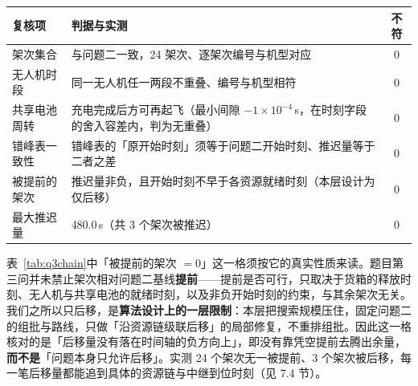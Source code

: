 \begin{center}
\begin{minipage}{\textwidth}
	\label{tab:q3chain}
	\centering
	\begin{tabularx}{0.98\textwidth}{lXc}
		\toprule
		复核项 & 判据与实测 & 不符 \\
		\midrule
		架次集合 & 与问题二一致，24 架次、逐架次编号与机型对应 & 0 \\
		无人机时段 & 同一无人机任一两段不重叠、编号与机型相符 & 0 \\
		共享电池周转 & 充电完成后方可再起飞（最小间隙 $-1\times10^{-4}$\,s，在时刻字段的舍入容差内，判为无重叠） & 0 \\
		错峰表一致性 & 错峰表的「原开始时刻」须等于问题二开始时刻、推迟量等于二者之差 & 0 \\
		被提前的架次 & 推迟量非负，且开始时刻不早于各资源就绪时刻（本层设计为仅后移） & 0 \\
		最大推迟量 & 480.0\,s（共 3 个架次被推迟） & 0 \\
		\bottomrule
	\end{tabularx}
\end{minipage}
\end{center}

表~\ref{tab:q3chain}中「被提前的架次 $=0$」这一格须按它的真实性质来读。题目第三问并未禁止架次相对问题二基线\textbf{提前}——提前是否可行，只取决于货箱的释放时刻、无人机与共享电池的就绪时刻，以及非负开始时刻的约束，与其余架次无关。我们之所以只后移，是\textbf{算法设计上的一层限制}：本层把搜索规模压住，固定问题二的组批与路线，只做「沿资源链级联后移」的局部修复，不重排组批。因此这一格核对的是「后移量没有落在时间轴的负方向上」，即没有靠凭空提前去腾出余量，\textbf{而不是}「问题本身只允许后移」。实测 24 个架次无一被提前、3 个架次被后移，每一笔后移量都能追到具体的资源链与中继到位时刻（见 7.4 节）。

